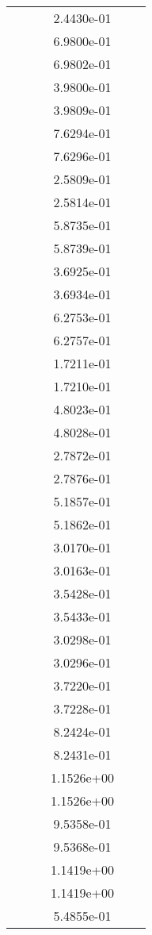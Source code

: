 \begin{xltabular}{\textwidth}{r|rS[table-format=1.3e+2]S[table-format=1.4e+2]S[table-format=1.4e+2]S[table-format=-1.5]}
&  &  & 2.4430e-01 & & \\
&  &  & 6.9800e-01 & & \\
&  &  & 6.9802e-01 & & \\
&  &  & 3.9800e-01 & & \\
&  &  & 3.9809e-01 & & \\
&  &  & 7.6294e-01 & & \\
&  &  & 7.6296e-01 & & \\
&  &  & 2.5809e-01 & & \\
&  &  & 2.5814e-01 & & \\
&  &  & 5.8735e-01 & & \\
&  &  & 5.8739e-01 & & \\
&  &  & 3.6925e-01 & & \\
&  &  & 3.6934e-01 & & \\
&  &  & 6.2753e-01 & & \\
&  &  & 6.2757e-01 & & \\
&  &  & 1.7211e-01 & & \\
&  &  & 1.7210e-01 & & \\
&  &  & 4.8023e-01 & & \\
&  &  & 4.8028e-01 & & \\
&  &  & 2.7872e-01 & & \\
&  &  & 2.7876e-01 & & \\
&  &  & 5.1857e-01 & & \\
&  &  & 5.1862e-01 & & \\
&  &  & 3.0170e-01 & & \\
&  &  & 3.0163e-01 & & \\
&  &  & 3.5428e-01 & & \\
&  &  & 3.5433e-01 & & \\
&  &  & 3.0298e-01 & & \\
&  &  & 3.0296e-01 & & \\
&  &  & 3.7220e-01 & & \\
&  &  & 3.7228e-01 & & \\
&  &  & 8.2424e-01 & & \\
&  &  & 8.2431e-01 & & \\
&  &  & 1.1526e+00 & & \\
&  &  & 1.1526e+00 & & \\
&  &  & 9.5358e-01 & & \\
&  &  & 9.5368e-01 & & \\
&  &  & 1.1419e+00 & & \\
&  &  & 1.1419e+00 & & \\
&  &  & 5.4855e-01 & & \\

\end{xltabular}
